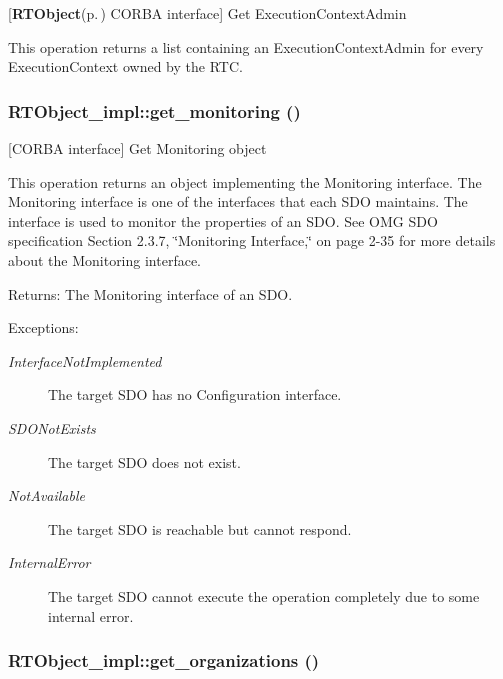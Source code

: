 [{\bf RTObject}{\rm (p.\,\pageref{namespaceRTObject})} CORBA interface] Get Execution\-Context\-Admin 

This operation returns a list containing an Execution\-Context\-Admin for every Execution\-Context owned by the RTC.
\subsubsection{\setlength{\rightskip}{0pt plus 5cm}RTObject\_\-impl::get\_\-monitoring ()}\label{classRTObject__impl_RTObject__impla44}


[CORBA interface] Get Monitoring object 

This operation returns an object implementing the Monitoring interface. The Monitoring interface is one of the interfaces that each SDO maintains. The interface is used to monitor the properties of an SDO. See OMG SDO specification Section 2.3.7, \char`\"{}Monitoring Interface,\char`\"{} on page 2-35 for more details about the Monitoring interface.

\begin{Desc}
\item[Returns:]The Monitoring interface of an SDO. \end{Desc}
\begin{Desc}
\item[Exceptions:]
\begin{description}
\item[{\em Interface\-Not\-Implemented}]The target SDO has no Configuration interface. \item[{\em SDONot\-Exists}]The target SDO does not exist. \item[{\em Not\-Available}]The target SDO is reachable but cannot respond. \item[{\em Internal\-Error}]The target SDO cannot execute the operation completely due to some internal error.\end{description}
\end{Desc}
\subsubsection{\setlength{\rightskip}{0pt plus 5cm}RTObject\_\-impl::get\_\-organizations ()}\label{classRTObject__impl_RTObject__impla45}


